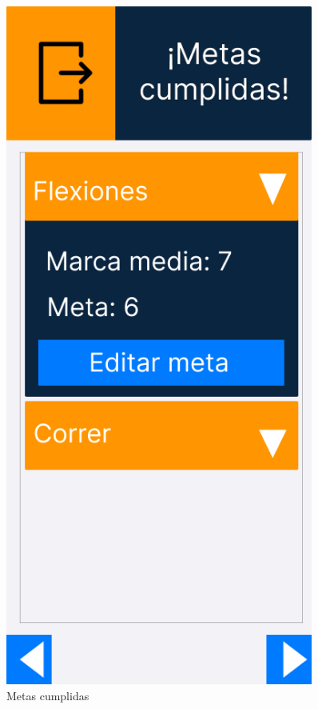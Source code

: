 \begin{figure}[H]
   \centering
   \begin{minipage}{0.45\textwidth}
      \centering
      \includegraphics[width=0.9\textwidth]{fotos/Frame 37.png}
      \caption{Metas cumplidas}

\end{minipage}
\end{figure}
